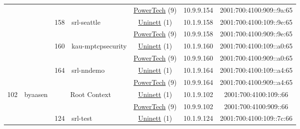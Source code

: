 \begin{small}
\begin{center}
\begin{longtable}{|c|c|c|c|c|c|c|c|}
  &  &  &  & \multicolumn{2}{|c|}{\tiny{\href{http://www.powertech.no}{PowerTech} (9)}} & \tiny{10.9.9.154} & \tiny{2001:700:4100:909::9a:65} \\* \cline{3-3}\cline{4-4}\cline{5-5}\cline{6-6}\cline{7-7}\cline{8-8}
  &  & \multirow{2}{*}{\tiny{158}} & \multicolumn{1}{|l|}{\multirow{2}{*}{\tiny{srl-seattle}}} & \multicolumn{2}{|c|}{\tiny{\href{https://www.uninett.no}{Uninett} (1)}} & \tiny{10.1.9.158} & \tiny{2001:700:4100:109::9e:65} \\* \cline{5-5}\cline{6-6}\cline{7-7}\cline{8-8}
  &  &  &  & \multicolumn{2}{|c|}{\tiny{\href{http://www.powertech.no}{PowerTech} (9)}} & \tiny{10.9.9.158} & \tiny{2001:700:4100:909::9e:65} \\* \cline{3-3}\cline{4-4}\cline{5-5}\cline{6-6}\cline{7-7}\cline{8-8}
  &  & \multirow{2}{*}{\tiny{160}} & \multicolumn{1}{|l|}{\multirow{2}{*}{\tiny{kau-mptcpsecurity}}} & \multicolumn{2}{|c|}{\tiny{\href{https://www.uninett.no}{Uninett} (1)}} & \tiny{10.1.9.160} & \tiny{2001:700:4100:109::a0:65} \\* \cline{5-5}\cline{6-6}\cline{7-7}\cline{8-8}
  &  &  &  & \multicolumn{2}{|c|}{\tiny{\href{http://www.powertech.no}{PowerTech} (9)}} & \tiny{10.9.9.160} & \tiny{2001:700:4100:909::a0:65} \\* \cline{3-3}\cline{4-4}\cline{5-5}\cline{6-6}\cline{7-7}\cline{8-8}
  &  & \multirow{2}{*}{\tiny{164}} & \multicolumn{1}{|l|}{\multirow{2}{*}{\tiny{srl-nndemo}}} & \multicolumn{2}{|c|}{\tiny{\href{https://www.uninett.no}{Uninett} (1)}} & \tiny{10.1.9.164} & \tiny{2001:700:4100:109::a4:65} \\* \cline{5-5}\cline{6-6}\cline{7-7}\cline{8-8}
  &  &  &  & \multicolumn{2}{|c|}{\tiny{\href{http://www.powertech.no}{PowerTech} (9)}} & \tiny{10.9.9.164} & \tiny{2001:700:4100:909::a4:65} \\ \hline
 \multirow{18}{*}{\tiny{102}} & \multicolumn{1}{|l|}{\multirow{18}{*}{\tiny{byaasen}}} & \multicolumn{2}{|c|}{\multirow{2}{*}{\tiny{Root Context}}} & \multicolumn{2}{|c|}{\tiny{\href{https://www.uninett.no}{Uninett} (1)}} & \tiny{10.1.9.102} & \tiny{2001:700:4100:109::66} \\* \cline{5-5}\cline{6-6}\cline{7-7}\cline{8-8}
  &  & \multicolumn{2}{|c|}{} & \multicolumn{2}{|c|}{\tiny{\href{http://www.powertech.no}{PowerTech} (9)}} & \tiny{10.9.9.102} & \tiny{2001:700:4100:909::66} \\* \cline{3-3}\cline{4-4}\cline{5-5}\cline{6-6}\cline{7-7}\cline{8-8}
  &  & \multirow{2}{*}{\tiny{124}} & \multicolumn{1}{|l|}{\multirow{2}{*}{\tiny{srl-test}}} & \multicolumn{2}{|c|}{\tiny{\href{https://www.uninett.no}{Uninett} (1)}} & \tiny{10.1.9.124} & \tiny{2001:700:4100:109::7c:66} \\* \cline{5-5}\cline{6-6}\cline{7-7}\cline{8-8}

\end{longtable}
\end{center}
\end{small}
